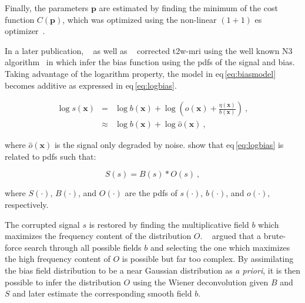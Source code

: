 \begin{enumerate}[leftmargin=*]
Finally, the parameters $\mathbf{p}$ are estimated by finding the minimum of
the cost function $C(\mathbf{p})$, which was optimized using the non-linear
$(1+1)$ \ac{es} optimizer~\cite{Styner1997}.

In a later publication, \citeauthor{Viswanath2012}~\cite{Viswanath2012} as well
as \citeauthor{giannini2015fully}~\cite{giannini2015fully} corrected
\ac{t2w}-\ac{mri} using the well known N3 algorithm~\cite{Sled1998} in which
\citeauthor{Sled1998} infer the bias function using the \acp{pdf} of the signal
and bias.
Taking advantage of the logarithm property, the model in
\acs{eq}\,\eqref{eq:biasmodel} becomes additive as expressed in
\acs{eq}\,\eqref{eq:logbias}.

\begin{eqnarray}
  \log s(\mathbf{x}) & = & \log b(\mathbf{x}) + \log \left( o(\mathbf{x}) +
                           \frac{\eta(\mathbf{x})}{b(\mathbf{x})} \right) \ ,
                           \nonumber \\
                     & \approx & \log b(\mathbf{x}) + \log \hat{o}(\mathbf{x})
                                 \ , \label{eq:logbias}
\end{eqnarray}

\noindent where $\hat{o}(\mathbf{x})$ is the signal only degraded by
noise. \citeauthor{Sled1998} show that \acs{eq}\,\eqref{eq:logbias} is related
to \acp{pdf} such that:

\begin{equation}
  S(s) = B(s) * O(s) \ ,
  \label{eq:distrbias}
\end{equation}

\noindent where $S(\cdot)$, $B(\cdot)$, and $O(\cdot)$ are the \acp{pdf} of
$s(\cdot)$, $b(\cdot)$, and $o(\cdot)$, respectively.

The corrupted signal $s$ is restored by finding the multiplicative field $b$
which maximizes the frequency content of the distribution $O$.
\citeauthor{Sled1998}~\cite{Sled1998} argued that a brute-force search through
all possible fields $b$ and selecting the one which maximizes the high
frequency content of $O$ is possible but far too complex.
By assimilating the bias field distribution to be a near Gaussian distribution
as \textit{a priori}, it is then possible to infer the distribution $O$ using
the Wiener deconvolution given $B$ and $S$ and later estimate the corresponding
smooth field $b$.


\end{enumerate}
